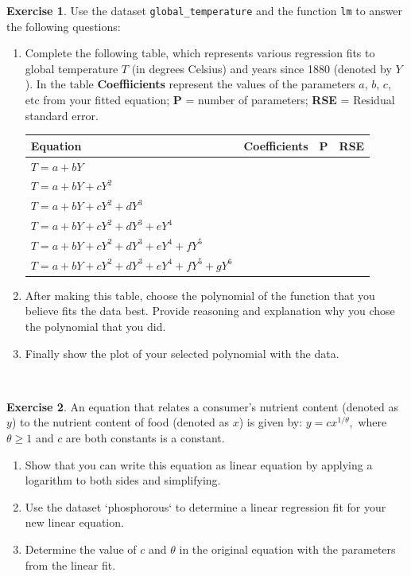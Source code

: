 \documentclass[
]{book}
\theoremstyle{definition}
\theoremstyle{definition}
\theoremstyle{definition}
\newtheorem{exercise}{Exercise}[chapter]
\theoremstyle{remark}
\begin{document}
\begin{exercise}
\protect\hypertarget{exr:unnamed-chunk-148}{}{\label{exr:unnamed-chunk-148} }Use the dataset \texttt{global\_temperature} and the function \texttt{lm} to answer the following questions:

\begin{enumerate}[label=\alph*.]
\item Complete the following table, which represents various regression fits to global temperature $T$ (in degrees Celsius) and years since 1880 (denoted by $Y$). In the table \textbf{Coeffiicients} represent the values of the parameters $a$, $b$, $c$, etc from your fitted equation; \textbf{P} =  number of parameters; \textbf{RSE} = Residual standard error.

\begin{tabular}{l|c|c|c}
\textbf{Equation} & \textbf{Coefficients} & \textbf{P} & \textbf{RSE} \\ \hline
     $T=a+bY$ &&& \\
    $T=a+bY+cY^{2}$ &&& \\
     $T=a+bY+cY^{2}+dY^{3}$ &&& \\
     $T=a+bY+cY^{2}+dY^{3}+eY^{4}$ &&& \\
   $T=a+bY+cY^{2}+dY^{3}+eY^{4}+fY^{5}$ &&& \\
      $T=a+bY+cY^{2}+dY^{3}+eY^{4}+fY^{5}+gY^{6}$ &&&
\end{tabular}

\item After making this table, choose the polynomial of the function that you believe fits the data best.  Provide reasoning and explanation why you chose the polynomial that you did.
\item Finally show the plot of your selected polynomial with the data.
\end{enumerate}
\end{exercise}

~
\begin{exercise}
\protect\hypertarget{exr:log-linear-08}{}{\label{exr:log-linear-08} }An equation that relates a consumer's nutrient content (denoted as \(y\)) to the nutrient content of food (denoted as \(x\)) is given by: \(\displaystyle y = c x^{1/\theta},\) where \(\theta \geq 1\) and \(c\) are both constants is a constant.

\begin{enumerate}[label=\alph*.]
\item Show that you can write this equation as linear equation by applying a logarithm to both sides and simplifying.
\item Use the dataset `phosphorous` to determine a linear regression fit for your new linear equation.
\item Determine the value of $c$ and $\theta$ in the original equation with the parameters from the linear fit.
\end{enumerate}
\end{exercise}
\end{document}
